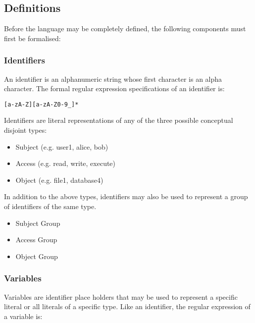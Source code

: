 \documentclass[a4paper,draft]{article}
\begin{document}
    \subsection{Definitions}

      Before the language may be completely defined, the following components 
      must first be formalised:
 
      \subsubsection{Identifiers}

        An identifier is an alphanumeric string whose first character is an
        alpha character. The formal regular expression specifications of an
        identifier is:

\begin{verbatim}
[a-zA-Z][a-zA-Z0-9_]*
\end{verbatim}

        Identifiers are literal representations of any of the three possible
        conceptual disjoint types:

        \begin{itemize}
          \item Subject (e.g. user1, alice, bob)
          \item Access (e.g. read, write, execute)
          \item Object (e.g. file1, database4)
        \end{itemize}

        In addition to the above types, identifiers may also be used to
        represent a group of identifiers of the same type.

        \begin{itemize}
          \item Subject Group
          \item Access Group
          \item Object Group
        \end{itemize}

      \subsubsection{Variables}

        Variables are identifier place holders that may be used to represent a
        specific literal or all literals of a specific type. Like an identifier,
        the regular expression of a variable is:
\end{document}

